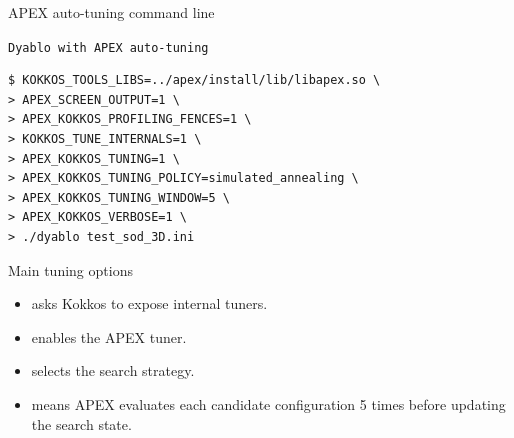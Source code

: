 \documentclass[11pt]{beamer}
\begin{document}
\begin{frame}[fragile,t]{APEX auto-tuning command line}
\begin{beamerboxesrounded}[upper=terminal title,lower=terminal body,width=\linewidth,shadow=false]{%
\textcolor{red!70}{\footnotesize\textbullet}\hspace{0.15em}%
\textcolor{yellow!80}{\footnotesize\textbullet}\hspace{0.15em}%
\textcolor{green!70!black}{\footnotesize\textbullet}\hspace{0.55em}%
\texttt{\scriptsize Dyablo with APEX auto-tuning}}
\begin{lstlisting}[style=terminal,basicstyle=\ttfamily\footnotesize\color{termText}]
$ KOKKOS_TOOLS_LIBS=../apex/install/lib/libapex.so \
> APEX_SCREEN_OUTPUT=1 \
> APEX_KOKKOS_PROFILING_FENCES=1 \
> KOKKOS_TUNE_INTERNALS=1 \
> APEX_KOKKOS_TUNING=1 \
> APEX_KOKKOS_TUNING_POLICY=simulated_annealing \
> APEX_KOKKOS_TUNING_WINDOW=5 \
> APEX_KOKKOS_VERBOSE=1 \
> ./dyablo test_sod_3D.ini
\end{lstlisting}
\end{beamerboxesrounded}

{\color{ceaGreen}\scriptsize Main tuning options}
\scriptsize
\begin{itemize}\itemsep0.02em
    \item {} asks Kokkos to expose internal tuners.
    \item {} enables the APEX tuner.
    \item {} selects the search strategy.
    \item {} means APEX evaluates each candidate configuration 5 times before updating the search state.
\end{itemize}
\end{frame}
\end{document}
